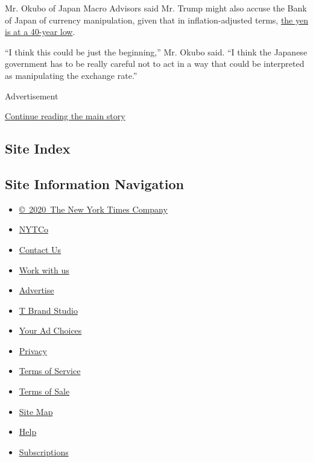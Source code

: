 Mr. Okubo of Japan Macro Advisors said Mr. Trump might also accuse the
Bank of Japan of currency manipulation, given that in inflation-adjusted
terms,
\href{https://www.japanmacroadvisors.com/page/category/economic-indicators/financial-markets/exchange-rates/?gids=190-5\&graph_index=0\&graph_type=line\&graph_data_from=11-2-1970\&graph_data_to=1-11-2016}{the
yen is at a 40-year low}.

``I think this could be just the beginning,'' Mr. Okubo said. ``I think
the Japanese government has to be really careful not to act in a way
that could be interpreted as manipulating the exchange rate.''

Advertisement

\protect\hyperlink{after-bottom}{Continue reading the main story}

\hypertarget{site-index}{%
\subsection{Site Index}\label{site-index}}

\hypertarget{site-information-navigation}{%
\subsection{Site Information
Navigation}\label{site-information-navigation}}

\begin{itemize}
\tightlist
\item
  \href{https://help.nytimes.com/hc/en-us/articles/115014792127-Copyright-notice}{©~2020~The
  New York Times Company}
\end{itemize}

\begin{itemize}
\tightlist
\item
  \href{https://www.nytco.com/}{NYTCo}
\item
  \href{https://help.nytimes.com/hc/en-us/articles/115015385887-Contact-Us}{Contact
  Us}
\item
  \href{https://www.nytco.com/careers/}{Work with us}
\item
  \href{https://nytmediakit.com/}{Advertise}
\item
  \href{http://www.tbrandstudio.com/}{T Brand Studio}
\item
  \href{https://www.nytimes.com/privacy/cookie-policy\#how-do-i-manage-trackers}{Your
  Ad Choices}
\item
  \href{https://www.nytimes.com/privacy}{Privacy}
\item
  \href{https://help.nytimes.com/hc/en-us/articles/115014893428-Terms-of-service}{Terms
  of Service}
\item
  \href{https://help.nytimes.com/hc/en-us/articles/115014893968-Terms-of-sale}{Terms
  of Sale}
\item
  \href{https://spiderbites.nytimes.com}{Site Map}
\item
  \href{https://help.nytimes.com/hc/en-us}{Help}
\item
  \href{https://www.nytimes.com/subscription?campaignId=37WXW}{Subscriptions}
\end{itemize}
